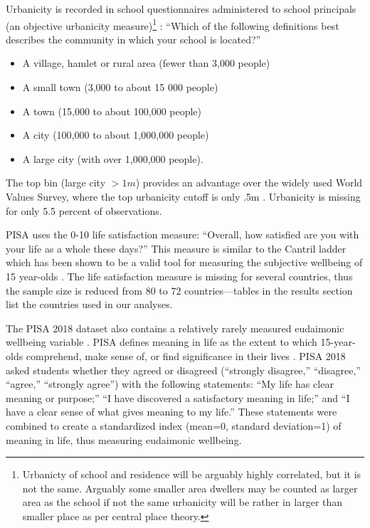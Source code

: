\documentclass[10pt, letterpaper]{article}
\begin{document}
\begin{spacing}{1.4}
Urbanicity is recorded in school questionnaires administered to school
principals (an objective urbanicity measure)\footnote{Urbanicty of school and
  residence will be arguably highly correlated, but it is not the same. Arguably
  some smaller area dwellers may be counted as larger area as the school if not
  the same urbanicity will be rather in larger than smaller place as per central
  place theory.
}%
: ``Which of the following definitions best describes the community in which your school is located?''
\begin{itemize}
\item A village, hamlet or rural area (fewer than 3,000 people)
\item A small town (3,000 to about 15 000 people)
\item A town (15,000 to about 100,000 people)
\item A city (100,000 to about 1,000,000 people)
\item A large city (with over 1,000,000 people). 
\end{itemize}

The top bin (large city $>1m$) provides an advantage over the widely used World Values Survey, where the top urbanicity cutoff is only .5m \citep{deb23,ebshoy24}. Urbanicity is missing for only 5.5 percent of
observations. 

PISA uses the 0-10 life satisfaction measure: ``Overall, how satisfied are you with
your life as a whole these days?''
 This measure is similar to the Cantril ladder which has been shown to be a valid tool for
measuring the subjective wellbeing of 15 year-olds \citep{levin2014reliability}.
 The life satisfaction measure is missing for several countries, thus the sample size is reduced from 80 to 72 countries---tables in the results section list the countries used in our analyses. 

The PISA 2018 dataset also contains a relatively rarely measured eudaimonic wellbeing variable \citep[see][]{proctor16}. PISA defines meaning in life as the extent to which 15-year-olds comprehend, make sense of, or find significance in their lives \citep{pisa18}. PISA 2018 asked students whether they agreed or disagreed (``strongly disagree,'' ``disagree,'' ``agree,'' ``strongly agree'') with the following
statements: ``My life has clear meaning or purpose;'' ``I have discovered a
satisfactory meaning in life;'' and ``I have a clear sense of what gives meaning
to my life.'' These statements were combined to create a standardized index (mean=0, standard deviation=1) of meaning in life, thus measuring eudaimonic wellbeing. 



\end{spacing}
\end{document}
